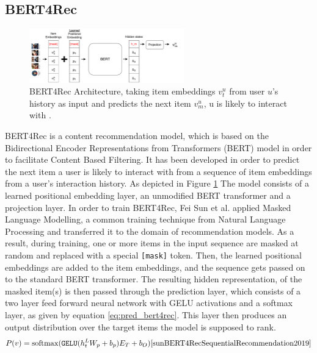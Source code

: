 \documentclass{Academic}
\begin{document}
        \subsection{BERT4Rec}\label{seq:bert4rec}
        \begin{figure}[ht!]
            \centering
            \includegraphics[width=0.6\textwidth]{images/BERT4Rec.pdf}
            \caption{BERT4Rec Architecture, taking item embeddings $v_t^u$ from user $u$'s history as input and predicts the next item $v_m^u$, u is likely to interact with \cite{sunBERT4RecSequentialRecommendation2019}.}
            \label{fig:bert4rec}
        \end{figure}
        BERT4Rec is a content recommendation model, which is based on the Bidirectional Encoder Representations from Transformers (BERT) model in order to facilitate Content Based Filtering. It has been developed in order to predict the next item a user is likely to interact with from a sequence of item embeddings from a user's interaction history. As depicted in Figure \ref{fig:bert4rec} The model consists of a learned positional embedding layer, an unmodified BERT transformer and a projection layer. In order to train BERT4Rec, Fei Sun et al. \cite{sunBERT4RecSequentialRecommendation2019} applied Masked Language Modelling, a common training technique from Natural Language Processing and transferred it to the domain of recommendation models. As a result, during training, one or more items in the input sequence are masked at random and replaced with a special \texttt{[mask]} token. Then, the learned positional embeddings are added to the item embeddings, and the sequence gets passed on to the standard BERT transformer. The resulting hidden representation, of the masked item(s) is then passed through the prediction layer, which consists of a two layer feed forward neural network with GELU activations and a softmax layer, as given by equation \ref{eq:pred_bert4rec}. This layer then produces an output distribution over the target items the model is supposed to rank.
        \begin{equation}\label{eq:pred_bert4rec}
            P(v) = \mathrm{softmax}(\texttt{GELU}(h_t^LW_p+b_p)E_T + b_O) \text{\cite{sunBERT4RecSequentialRecommendation2019}}
        \end{equation}
\end{document}
